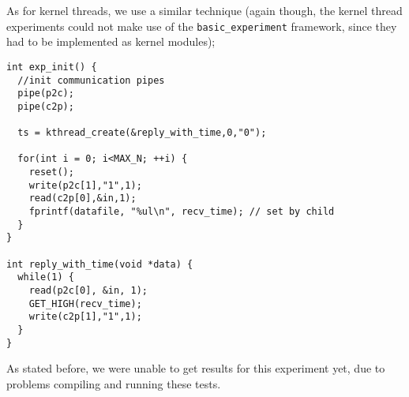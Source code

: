 \newpage

\noindent As for kernel threads, we use a similar technique (again though, the kernel thread experiments could not make use of the {\tt basic\_experiment} framework, since they had to be implemented as kernel modules);

\begin{verbatim}
int exp_init() {
  //init communication pipes
  pipe(p2c);
  pipe(c2p);

  ts = kthread_create(&reply_with_time,0,"0");
  
  for(int i = 0; i<MAX_N; ++i) {
    reset();
    write(p2c[1],"1",1);
    read(c2p[0],&in,1);
    fprintf(datafile, "%ul\n", recv_time); // set by child
  }
}

int reply_with_time(void *data) {
  while(1) {
    read(p2c[0], &in, 1);
    GET_HIGH(recv_time);
    write(c2p[1],"1",1);
  }
}
\end{verbatim}

\noindent As stated before, we were unable to get results for this experiment yet, due to problems compiling and running these tests.